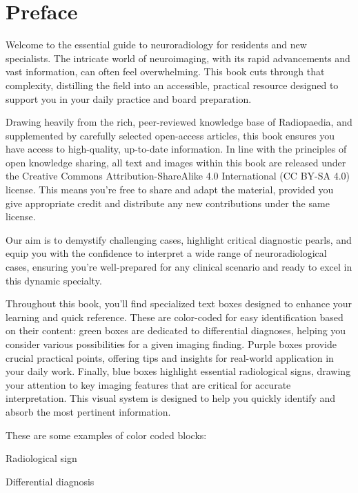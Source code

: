 \chapter*{Preface}
Welcome to the essential guide to neuroradiology for residents and new specialists. The intricate world of neuroimaging, with its rapid advancements and vast information, can often feel overwhelming. This book cuts through that complexity, distilling the field into an accessible, practical resource designed to support you in your daily practice and board preparation.

Drawing heavily from the rich, peer-reviewed knowledge base of Radiopaedia, and supplemented by carefully selected open-access articles, this book ensures you have access to high-quality, up-to-date information. In line with the principles of open knowledge sharing, all text and images within this book are released under the Creative Commons Attribution-ShareAlike 4.0 International (CC BY-SA 4.0) license. This means you're free to share and adapt the material, provided you give appropriate credit and distribute any new contributions under the same license.

Our aim is to demystify challenging cases, highlight critical diagnostic pearls, and equip you with the confidence to interpret a wide range of neuroradiological cases, ensuring you're well-prepared for any clinical scenario and ready to excel in this dynamic specialty.

Throughout this book, you'll find specialized text boxes designed to enhance your learning and quick reference. These are color-coded for easy identification based on their content: green boxes are dedicated to differential diagnoses, helping you consider various possibilities for a given imaging finding. Purple boxes provide crucial practical points, offering tips and insights for real-world application in your daily work. Finally, blue boxes highlight essential radiological signs, drawing your attention to key imaging features that are critical for accurate interpretation. This visual system is designed to help you quickly identify and absorb the most pertinent information.

These are some examples of color coded blocks:

\begin{tcolorbox}[colback=blue!5!white,colframe=blue!75!white,title=Radiological sign]
	Radiological sign
\end{tcolorbox}

\begin{tcolorbox}[colback=green!5!white,colframe=green!75!white,title=Differential diagnosis]
	Differential diagnosis
\end{tcolorbox}

